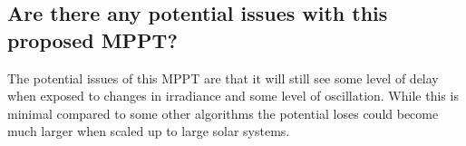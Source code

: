 \documentclass{article}
\begin{document}
		\subsection{Are there any potential issues with this proposed MPPT?}
			The potential issues of this MPPT are that it will still see some level of delay when exposed to changes in irradiance and some level of oscillation. While this is minimal compared to some other algorithms the potential loses could become much larger when scaled up to large solar systems.
	
	
				
\end{document}
